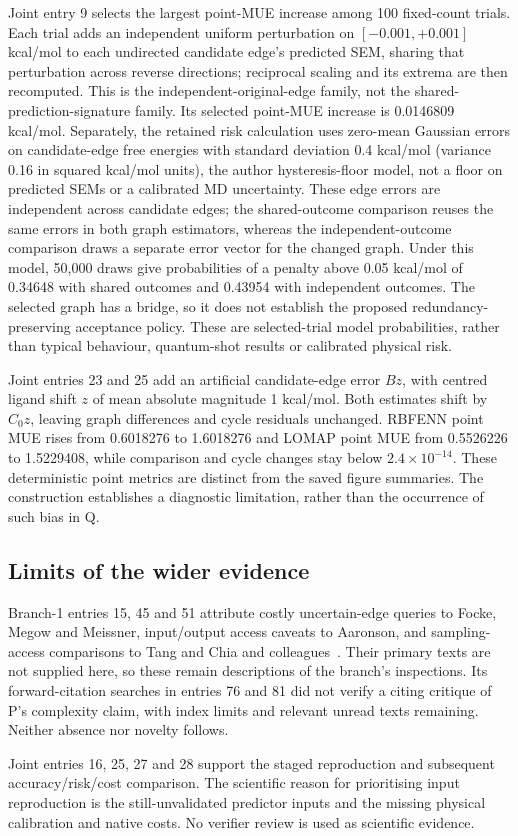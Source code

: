 \documentclass{article}
\begin{document}
Joint entry 9 selects the largest point-MUE increase among 100 fixed-count trials. Each trial adds an independent uniform perturbation on \([-0.001,+0.001]\) kcal/mol to each undirected candidate edge's predicted SEM, sharing that perturbation across reverse directions; reciprocal scaling and its extrema are then recomputed. This is the independent-original-edge family, not the shared-prediction-signature family. Its selected point-MUE increase is 0.0146809 kcal/mol. Separately, the retained risk calculation uses zero-mean Gaussian errors on candidate-edge free energies with standard deviation 0.4 kcal/mol (variance 0.16 in squared kcal/mol units), the author hysteresis-floor model, not a floor on predicted SEMs or a calibrated MD uncertainty. These edge errors are independent across candidate edges; the shared-outcome comparison reuses the same errors in both graph estimators, whereas the independent-outcome comparison draws a separate error vector for the changed graph. Under this model, 50,000 draws give probabilities of a penalty above 0.05 kcal/mol of 0.34648 with shared outcomes and 0.43954 with independent outcomes. The selected graph has a bridge, so it does not establish the proposed redundancy-preserving acceptance policy. These are selected-trial model probabilities, rather than typical behaviour, quantum-shot results or calibrated physical risk.

Joint entries 23 and 25 add an artificial candidate-edge error \(Bz\), with centred ligand shift \(z\) of mean absolute magnitude 1 kcal/mol. Both estimates shift by \(C_0z\), leaving graph differences and cycle residuals unchanged. RBFENN point MUE rises from 0.6018276 to 1.6018276 and LOMAP point MUE from 0.5526226 to 1.5229408, while comparison and cycle changes stay below \(2.4\times10^{-14}\). These deterministic point metrics are distinct from the saved figure summaries. The construction establishes a diagnostic limitation, rather than the occurrence of such bias in Q.

\subsection{Limits of the wider evidence}

Branch-1 entries 15, 45 and 51 attribute costly uncertain-edge queries to Focke, Megow and Meissner, input/output access caveats to Aaronson, and sampling-access comparisons to Tang and Chia and colleagues~\cite{queries,fineprint,Tang,Chia}. Their primary texts are not supplied here, so these remain descriptions of the branch's inspections. Its forward-citation searches in entries 76 and 81 did not verify a citing critique of P's complexity claim, with index limits and relevant unread texts remaining. Neither absence nor novelty follows.

Joint entries 16, 25, 27 and 28 support the staged reproduction and subsequent accuracy/risk/cost comparison. The scientific reason for prioritising input reproduction is the still-unvalidated predictor inputs and the missing physical calibration and native costs. No verifier review is used as scientific evidence.



\end{document}
